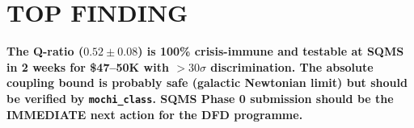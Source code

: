 \documentclass[11pt]{article}
\begin{document}
\section*{TOP FINDING}

\begin{tcolorbox}[colback=blue!5!white, colframe=blue!70!black]
\textbf{The Q-ratio ($0.52 \pm 0.08$) is 100\% crisis-immune and testable
at SQMS in 2 weeks for \$47--50K with $>30\sigma$ discrimination. The
absolute coupling bound is probably safe (galactic Newtonian limit) but
should be verified by \texttt{mochi\_class}. SQMS Phase 0 submission
should be the IMMEDIATE next action for the DFD programme.}
\end{tcolorbox}
\end{document}
